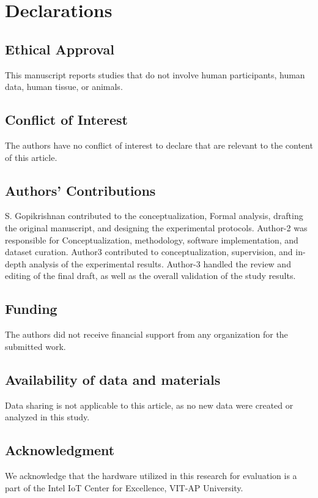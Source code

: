 \documentclass[a4paper,fleqn]{cas-dc}
\numberwithin{equation}{section}
\begin{document}
\section*{Declarations}
\subsection*{Ethical Approval}
This manuscript reports studies that do not involve human participants, human data, human tissue, or animals.

\subsection*{Conflict of Interest}
The authors have no conflict of interest to declare that are relevant to the content of this article.

\subsection*{Authors' Contributions}
S. Gopikrishnan contributed to the conceptualization, Formal analysis, drafting the original manuscript, and designing the experimental protocols. Author-2 was responsible for Conceptualization, methodology, software implementation, and dataset curation. Author3 contributed to conceptualization, supervision, and in-depth analysis of the experimental results. Author-3 handled the review and editing of the final draft, as well as the overall validation of the study results.


\subsection*{Funding}
The authors did not receive financial support from any organization for the submitted work.

\subsection*{Availability of data and materials}
Data sharing is not applicable to this article, as no new data were created or analyzed in this study.

\subsection*{Acknowledgment}
We acknowledge that the hardware utilized in this research for evaluation is a part of the Intel IoT Center for Excellence, VIT-AP University. 



\end{document}
